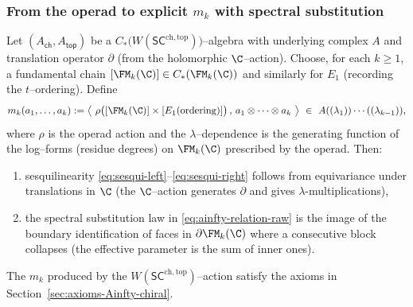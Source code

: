 \subsubsection{From the operad to explicit $m_k$ with spectral substitution}
\label{subsec:operad-to-mk}
Let $(A_{\mathsf{ch}},A_{\mathsf{top}})$ be a $C_\ast\!\bigl(W(\mathsf{SC}^{\mathrm{ch,top}})\bigr)$--algebra with underlying complex $A$ and translation operator $\partial$ (from the holomorphic \(\C\)--action). Choose, for each $k\ge1$, a fundamental chain $[\FM_k(\C)]\in C_\ast(\FM_k(\C))$ and similarly for $E_1$ (recording the $t$--ordering). Define
\[
m_k(a_1,\dots,a_k)
:= \bigl\langle\ \rho\bigl([\FM_k(\C)]\times [E_1(\text{ordering})]\bigr)\,,\, a_1\otimes\cdots\otimes a_k\ \bigr\rangle
\ \in\ A((\lambda_1))\cdots((\lambda_{k-1})),
\]
where $\rho$ is the operad action and the \(\lambda\)--dependence is the generating function of the log--forms (residue degrees) on $\FM_k(\C)$ prescribed by the operad.
Then:
\begin{enumerate}[label=(\alph*)]
 \item sesquilinearity \eqref{eq:sesqui-left}--\eqref{eq:sesqui-right} follows from equivariance under translations in $\C$ (the \(\C\)--action generates $\partial$ and gives \(\lambda\)-multiplications),
 \item the spectral substitution law in \eqref{eq:ainfty-relation-raw} is the image of the boundary identification of faces in $\partial\FM_k(\C)$ where a consecutive block collapses (the effective parameter is the sum of inner ones).
\end{enumerate}

\begin{proposition}
\label{prop:operad-implies-axioms}
The $m_k$ produced by the $W(\mathsf{SC}^{\mathrm{ch,top}})$--action satisfy the axioms in Section~\ref{sec:axioms-Ainfty-chiral}.
\end{proposition}

